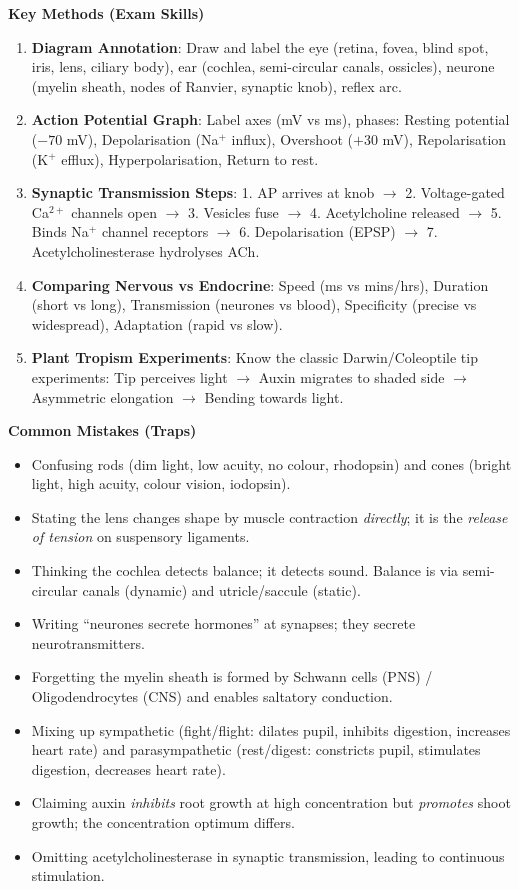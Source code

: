 \documentclass[11pt]{article}
\newcommand{\cle}[1]{{\popxbold\color{popdark}#1}}
\begin{document}
\begin{bilan}
\textbf{Key Methods (Exam Skills)}
\begin{enumerate}
  \item \textbf{Diagram Annotation}: Draw and label the eye (retina, fovea, blind spot, iris, lens, ciliary body), ear (cochlea, semi-circular canals, ossicles), neurone (myelin sheath, nodes of Ranvier, synaptic knob), reflex arc.
  \item \textbf{Action Potential Graph}: Label axes (mV vs ms), phases: Resting potential ($-70$ mV), Depolarisation (Na$^+$ influx), Overshoot ($+30$ mV), Repolarisation (K$^+$ efflux), Hyperpolarisation, Return to rest.
  \item \textbf{Synaptic Transmission Steps}: 1. AP arrives at knob $\to$ 2. Voltage-gated Ca$^{2+}$ channels open $\to$ 3. Vesicles fuse $\to$ 4. Acetylcholine released $\to$ 5. Binds Na$^+$ channel receptors $\to$ 6. Depolarisation (EPSP) $\to$ 7. Acetylcholinesterase hydrolyses ACh.
  \item \textbf{Comparing Nervous vs Endocrine}: Speed (ms vs mins/hrs), Duration (short vs long), Transmission (neurones vs blood), Specificity (precise vs widespread), Adaptation (rapid vs slow).
  \item \textbf{Plant Tropism Experiments}: Know the classic Darwin/Coleoptile tip experiments: Tip perceives light $\to$ Auxin migrates to shaded side $\to$ Asymmetric elongation $\to$ Bending towards light.
\end{enumerate}

\textbf{Common Mistakes (Traps)}
\begin{itemize}
  \item Confusing \cle{rods} (dim light, low acuity, no colour, rhodopsin) and \cle{cones} (bright light, high acuity, colour vision, iodopsin).
  \item Stating the lens changes shape by muscle contraction \emph{directly}; it is the \emph{release of tension} on suspensory ligaments.
  \item Thinking the \cle{cochlea} detects balance; it detects sound. Balance is via \cle{semi-circular canals} (dynamic) and \cle{utricle/saccule} (static).
  \item Writing ``neurones secrete hormones'' at synapses; they secrete \cle{neurotransmitters}.
  \item Forgetting the \cle{myelin sheath} is formed by Schwann cells (PNS) / Oligodendrocytes (CNS) and enables \cle{saltatory conduction}.
  \item Mixing up \cle{sympathetic} (fight/flight: dilates pupil, inhibits digestion, increases heart rate) and \cle{parasympathetic} (rest/digest: constricts pupil, stimulates digestion, decreases heart rate).
  \item Claiming auxin \emph{inhibits} root growth at high concentration but \emph{promotes} shoot growth; the concentration optimum differs.
  \item Omitting \cle{acetylcholinesterase} in synaptic transmission, leading to continuous stimulation.
\end{itemize}


\end{bilan}
\end{document}
